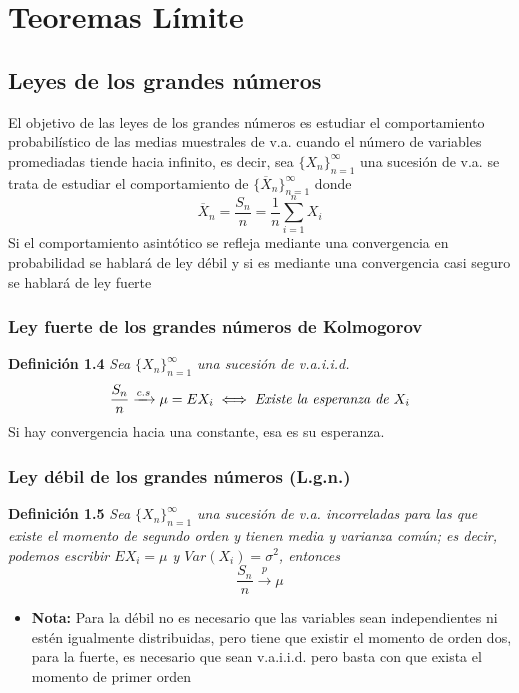 	\newpage
	
	\section{Teoremas Límite}
	
	\subsection{Leyes de los grandes números}
	
	\noindent El objetivo de las leyes de los grandes números es estudiar el comportamiento probabilístico de las medias muestrales de v.a. cuando el número de variables promediadas
	tiende hacia infinito, es decir, sea $\{X_n\}^{\infty}_{n=1}$ una sucesión de v.a. se trata de estudiar el comportamiento de $\{\overline{X}_n\}^{\infty}_{n=1}$ donde $$\overline{X}_n=\frac{S_n}{n}=\frac{1}{n}\sum_{i=1}^{n}X_i$$Si el comportamiento asintótico se refleja mediante una
	convergencia en probabilidad se hablará de ley débil y si
	es mediante una convergencia casi seguro se hablará de
	ley fuerte
	
	\subsubsection*{Ley fuerte de los grandes números de Kolmogorov}
	
	\noindent \textbf{Definición 1.4} \textit{Sea $\{X_n\}^{\infty}_{n=1}$ una sucesión de v.a.i.i.d. }$$\frac{S_n}{n}\xrightarrow{c.s}\mu = EX_i \iff \text{\textit{Existe la esperanza de $X_i$}}$$ Si hay convergencia hacia una constante, esa es su esperanza.
	
	\subsubsection*{Ley débil de los grandes números (L.g.n.)}
	
	\noindent \textbf{Definición 1.5} \textit{Sea $\{X_n\}^{\infty}_{n=1}$ una sucesión de v.a. incorreladas para las que existe el momento de segundo orden y tienen media y varianza común; es decir, podemos escribir $EX_i=\mu$ y $Var(X_i)=\sigma^{2}$, entonces }$$\frac{S_n}{n}\xrightarrow{p}\mu$$
	\begin{itemize}
		\item \textbf{Nota: }Para la débil no es necesario que las variables sean independientes ni estén igualmente distribuidas, pero tiene que existir el momento de orden dos, para la fuerte, es necesario que sean v.a.i.i.d. pero basta con que exista el momento de primer orden\\
		
	\end{itemize}
	
